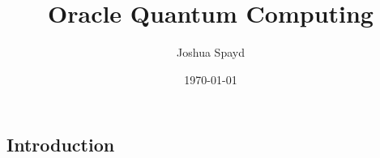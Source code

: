 \documentclass[table]{article}
\title{Oracle Quantum Computing}
\author{Joshua Spayd}
\date{\today}
\begin{document}
\maketitle

\begin{multicols}{2}
\section{Introduction}
\end{multicols}
\end{document}
